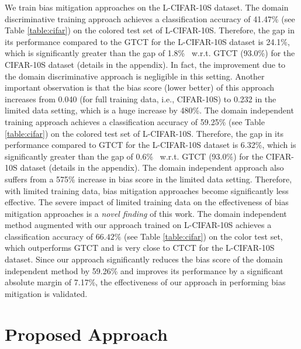 \documentclass[10pt,twocolumn,letterpaper]{article}
\begin{document}
We train bias mitigation approaches on the L-CIFAR-10S dataset. The domain discriminative training approach \cite{wang2020towards} achieves a classification accuracy of 41.47\% (see Table \ref{table:cifar}) on the colored test set of L-CIFAR-10S. Therefore, the gap in its performance compared to the GTCT for the L-CIFAR-10S dataset is 24.1\%, which is significantly greater than the gap of 1.8\%~\cite{wang2020towards}  w.r.t. GTCT (93.0\%) for the CIFAR-10S dataset (details in the appendix). In fact, the improvement due to the domain discriminative approach is negligible in this setting. Another important observation is that the bias score (lower better) of this approach increases from 0.040 (for full training data, i.e., CIFAR-10S) to 0.232 in the limited data setting, which is a huge increase by 480\%. The domain independent training approach \cite{wang2020towards} achieves a classification accuracy of 59.25\% (see Table \ref{table:cifar}) on the colored test set of L-CIFAR-10S. Therefore, the gap in its performance compared to GTCT for the L-CIFAR-10S dataset is 6.32\%, which is significantly greater than the gap of 0.6\%~\cite{wang2020towards} w.r.t. GTCT (93.0\%) for the CIFAR-10S dataset (details in the appendix). The domain independent approach also suffers from a 575\% increase in bias score in the limited data setting. Therefore, with limited training data, bias mitigation approaches become significantly less effective. The severe impact of limited training data on the effectiveness of bias mitigation approaches is a \textit{novel finding} of this work. The domain independent method augmented with our approach trained on L-CIFAR-10S achieves a classification accuracy of $66.42\%$ (see Table \ref{table:cifar}) on the color test set, which outperforms GTCT and is very close to CTCT for the L-CIFAR-10S dataset. Since our approach significantly reduces the bias score of the domain independent method by 59.26\% and improves its performance by a significant absolute margin of 7.17\%, the effectiveness of our approach in performing bias mitigation is validated.








\section{Proposed Approach} 
 
\end{document}
